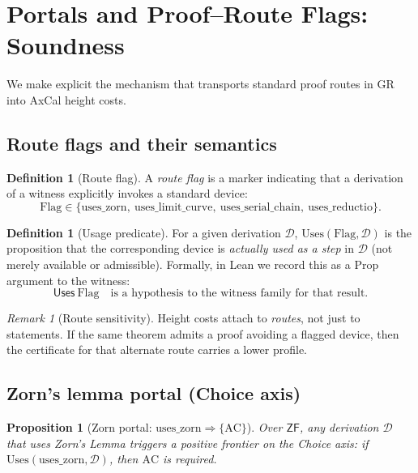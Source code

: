 \documentclass[11pt]{article}
\newtheorem{proposition}[theorem]{Proposition}
\theoremstyle{definition}
\newtheorem{definition}[theorem]{Definition}
\theoremstyle{remark}
\newtheorem{remark}[theorem]{Remark}
\newcommand{\ZF}{\mathsf{ZF}}
\begin{document}
\section{Portals and Proof–Route Flags: Soundness}
\label{sec:portal-soundness}

We make explicit the mechanism that transports standard proof routes in GR into AxCal height costs.

\subsection{Route flags and their semantics}

\begin{definition}[Route flag]
A \emph{route flag} is a marker indicating that a derivation of a witness explicitly invokes a standard device:
\[
\mathrm{Flag} \in \{\mathrm{uses\_zorn},\ \mathrm{uses\_limit\_curve},\ \mathrm{uses\_serial\_chain},\ \mathrm{uses\_reductio}\}.
\]
\end{definition}

\begin{definition}[Usage predicate]
For a given derivation $\mathcal{D}$, $\mathrm{Uses}(\mathrm{Flag},\mathcal{D})$ is the proposition that the corresponding device is \emph{actually used as a step} in $\mathcal{D}$ (not merely available or admissible). Formally, in Lean we record this as a Prop argument to the witness:
\[
\mathsf{Uses}\ \mathrm{Flag} \quad\text{is a hypothesis to the witness family for that result.}
\]
\end{definition}

\begin{remark}[Route sensitivity]
Height costs attach to \emph{routes}, not just to statements. If the same theorem admits a proof avoiding a flagged device, then the certificate for that alternate route carries a lower profile.
\end{remark}

\subsection{Zorn's lemma portal (Choice axis)}

\begin{proposition}[Zorn portal: $\mathrm{uses\_zorn}\Rightarrow\{\mathrm{AC}\}$]
\label{prop:zorn-portal}
Over $\ZF$, any derivation $\mathcal{D}$ that uses Zorn's Lemma triggers a positive frontier on the Choice axis: if $\mathrm{Uses}(\mathrm{uses\_zorn},\mathcal{D})$, then $\mathrm{AC}$ is required.
\end{proposition}
\end{document}
